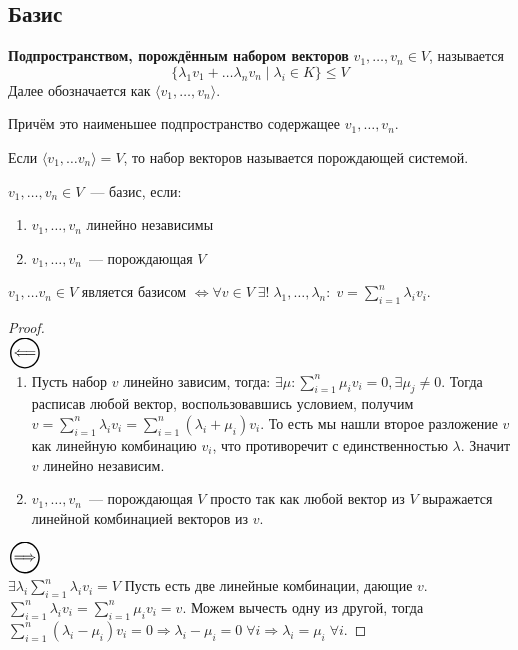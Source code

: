 \subsection{Базис}
\begin{definition}
    \textbf{Подпространством, порождённым набором векторов} $v_1, \dots, v_n\in V$, называется
    $$\{\lambda_1v_1 + \dots \lambda_nv_n \mid \lambda_i\in K\}\le V$$
    Далее обозначается как $\langle v_1,\dots, v_n\rangle$.\\
\end{definition}
\begin{remark}
    Причём это наименьшее подпространство содержащее $v_1,\dots,v_n$.
\end{remark}
\begin{definition}
    Если $\langle v_1,\dots v_n\rangle = V$, то набор векторов называется
    порождающей системой.
\end{definition}
\begin{definition}
    $v_1, \dots, v_n\in V$~--- базис, если:
    \begin{enumerate}
        \item $v_1,\dots,v_n$ линейно независимы
        \item $v_1,\dots, v_n$~--- порождающая $V$
    \end{enumerate}
\end{definition}
\begin{lemma}
    $v_1,\dots v_n \in V$ является базисом $\Leftrightarrow \forall v\in V \; \exists !\;
    \lambda_1,\dots,\lambda_n\colon\; v = \sum\limits_{i=1}^{n}\lambda_iv_i$.
\end{lemma}
\begin{proof} \leavevmode\\
    $\ola$
    \begin{enumerate}
        \item Пусть набор $v$ линейно зависим, тогда: $\exists \mu \colon \sum\limits_{i=1}^{n}\mu_iv_i=0, \exists \mu_j\not=0$.
            Тогда расписав любой вектор, воспользовавшись условием, получим 
            $v = \sum\limits_{i=1}^{n}\lambda_iv_i = \sum\limits_{i=1}^{n}(\lambda_i+\mu_i)v_i$. То есть мы нашли
            второе разложение $v$ как линейную комбинацию $v_i$, что противоречит с единственностью $\lambda$.
            Значит $v$ линейно независим.
        \item $v_1,\dots, v_n$~--- порождающая $V$ просто так как любой вектор из $V$ выражается
            линейной комбинацией векторов из $v$.
    \end{enumerate}
    $\ora$

    $\exists \lambda_i \sum\limits_{i=1}^{n} \lambda_iv_i = V$
    Пусть есть две линейные комбинации, дающие $v$.
    $\sum\limits_{i=1}^{n} \lambda_iv_i = \sum\limits_{i=1}^{n} \mu_iv_i = v$. Можем вычесть одну из другой, тогда
    $\sum\limits_{i=1}^{n}(\lambda_i - \mu_i)v_i = 0\Rightarrow \lambda_i-\mu_i=0\;\forall i
    \Rightarrow \lambda_i = \mu_i\;\forall i$.
\end{proof}


